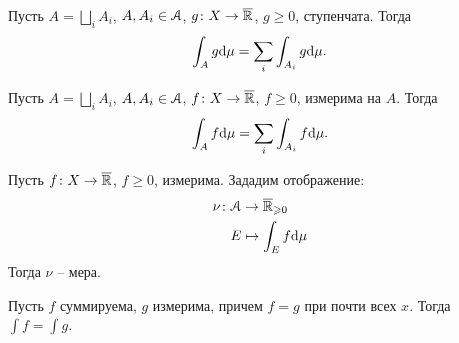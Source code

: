 \begin{lemma}
    Пусть $A = \bigsqcup_i{A_i}$, $A, A_i \in \mathcal{A}$, $g \colon X \to \overline{\mathbb{R}}$, $g \geqslant 0$, 
    ступенчата. Тогда
\[
    \int_A{g \mathrm{d}\mu} = \sum_i{\int_{A_i}{g \mathrm{d}\mu}}
.\] 
\end{lemma}

\begin{theorem}
    Пусть $A = \bigsqcup_i{A_i}$, $A, A_i \in \mathcal{A}$, $f \colon X \to \overline{\mathbb{R}}$, $f \geqslant 0$,
    измерима на $A$. Тогда
\[
    \int_A{f \mathrm{d}\mu} = \sum_i{\int_{A_i}{f \mathrm{d}\mu}}
.\] 
\end{theorem}

\begin{corollary}
    Пусть $f \colon X \to \overline{\mathbb{R}}$, $f \geqslant 0$, измерима. Зададим отображение:
    \begin{align*}
        \nu \colon &\mathcal{A} \to \overline{\mathbb{R}}_{\geqslant 0} \\ 
                   &E \mapsto \int_E{f \mathrm{d}\mu}
    \end{align*}
    Тогда $\nu$ -- мера.
\end{corollary}

\begin{lemma}
    Пусть $f$ суммируема, $g$ измерима, причем $f = g$ при почти всех $x$. Тогда
    $\displaystyle \int{f} = \int{g}$.
\end{lemma}

